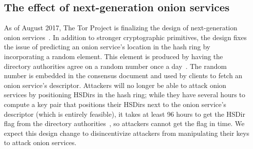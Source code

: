 \subsection{The effect of next-generation onion services}
As of August 2017, The Tor Project is finalizing the design of next-generation
onion services~\cite{prop224}.  In addition to stronger cryptographic
primitives, the design fixes the issue of predicting an onion service's location
in the hash ring by incorporating a random element.  This element is produced by
having the directory authorities agree on a random number once a
day~\cite{prop250}.  The random number is embedded in the consensus document and
used by clients to fetch an onion service's descriptor.  Attackers will no
longer be able to attack onion services by positioning HSDirs in the hash ring;
while they have several hours to compute a key pair that positions their HSDirs
next to the onion service's descriptor (which is entirely feasible), it takes at
least 96 hours to get the HSDir flag from the directory
authorities~\cite[\S~3.4.2]{dir-spec}, so attackers cannot get the flag in time.
We expect this design change to disincentivize attackers from manipulating their
keys to attack onion services.
